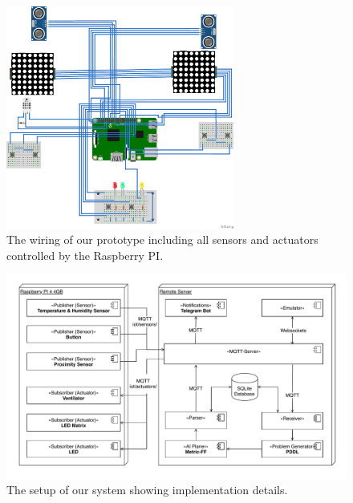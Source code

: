 \documentclass[runningheads]{llncs}
\begin{document}
	\begin{figure}
		\centering
		\includegraphics[width=7.5cm]{figures/setup_bb.png}
		\caption{The wiring of our prototype including all sensors and actuators controlled by the Raspberry PI.}
		\label{fig:wiring}
	\end{figure}
	\begin{figure}[bt]
		\centering
		\includegraphics[width=\linewidth]{figures/Deployment.pdf}
		\caption{The setup of our system showing implementation details.}
		\label{fig:setup}
	\end{figure}
	
\end{document}

